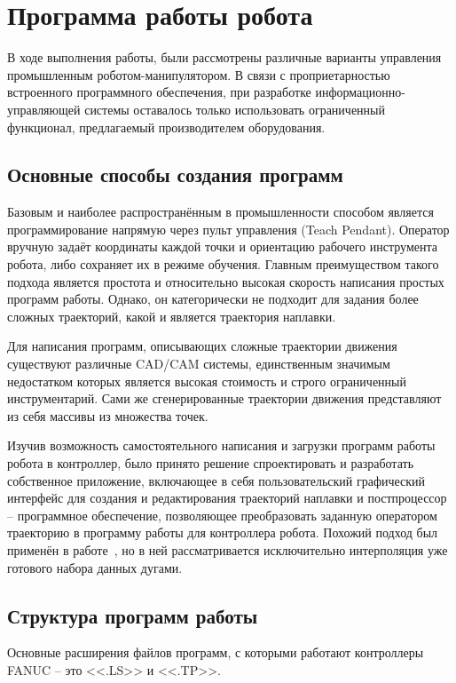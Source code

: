 \chapter{Программа работы робота}
В ходе выполнения работы, были рассмотрены различные варианты управления промышленным роботом-манипулятором.
В связи с проприетарностью встроенного программного обеспечения, при разработке информационно-управляющей системы оставалось только использовать ограниченный функционал, предлагаемый производителем оборудования.


\section{Основные способы создания программ}
Базовым и наиболее распространённым в промышленности способом является программирование напрямую через пульт управления (Teach Pendant).
Оператор вручную задаёт координаты каждой точки и ориентацию рабочего инструмента робота, либо сохраняет их в режиме обучения.
Главным преимуществом такого подхода является простота и относительно высокая скорость написания простых программ работы.
Однако, он категорически не подходит для задания более сложных траекторий, какой и является траектория наплавки.

Для написания программ, описывающих сложные траектории движения существуют различные CAD/CAM системы, единственным значимым недостатком которых является высокая стоимость и строго ограниченный инструментарий.
Сами же сгенерированные траектории движения представляют из себя массивы из множества точек.

Изучив возможность самостоятельного написания и загрузки программ работы робота в контроллер, было принято решение спроектировать и разработать собственное приложение, включающее в себя пользовательский графический интерфейс для создания и редактирования траекторий наплавки и постпроцессор -- программное обеспечение, позволяющее преобразовать заданную оператором траекторию в программу работы для контроллера робота.
Похожий подход был применён в работе~\cite{Nagata_2017}, но в ней рассматривается исключительно интерполяция уже готового набора данных дугами.


\section{Структура программ работы} \label{sec:ProgramStructure}
Основные расширения файлов программ, с которыми работают контроллеры FANUC -- это <<.LS>> и <<.TP>>.

